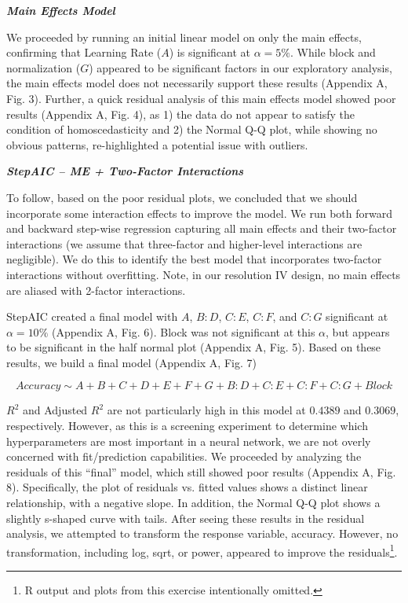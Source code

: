 \documentclass[12pt]{article}
\begin{document}
\vspace{.5pc}
\noindent \textbf{\textit{Main Effects Model}}
\vspace{.1pc}

We proceeded by running an initial linear model on only the main effects, confirming that Learning Rate ($A$) is significant at $\alpha = 5\%$. While block and normalization ($G$) appeared to be significant factors in our exploratory analysis, the main effects model does not necessarily support these results (Appendix A, Fig. 3). Further, a quick residual analysis of this main effects model showed poor results (Appendix A, Fig. 4), as 1) the data do not appear to satisfy the condition of homoscedasticity and 2) the Normal Q-Q plot, while showing no obvious patterns, re-highlighted a potential issue with outliers.

\vspace{.5pc}
\noindent \textbf{\textit{StepAIC – ME + Two-Factor Interactions}}
\vspace{.1pc}

To follow, based on the poor residual plots, we concluded that we should incorporate some interaction effects to improve the model. We run both forward and backward step-wise regression capturing all main effects and their two-factor interactions (we assume that three-factor and higher-level interactions are negligible). We do this to identify the best model that incorporates two-factor interactions without overfitting. Note, in our resolution IV design, no main effects are aliased with 2-factor interactions.

StepAIC created a final model with $A$, $B:D$, $C:E$, $C:F$, and $C:G$ significant at $\alpha = 10\%$ (Appendix A, Fig. 6). Block was not significant at this $\alpha$, but appears to be significant in the half normal plot (Appendix A, Fig. 5). Based on these results, we build a final model (Appendix A, Fig. 7)

$$Accuracy \sim A + B + C + D + E + F + G + B:D + C:E + C:F + C:G + Block$$

$R^2$ and Adjusted $R^2$ are not particularly high in this model at $0.4389$ and $0.3069$, respectively. However, as this is a screening experiment to determine which hyperparameters are most important in a neural network, we are not overly concerned with fit/prediction capabilities. We proceeded by analyzing the residuals of this “final” model, which still showed poor results (Appendix A, Fig. 8). Specifically, the plot of residuals vs. fitted values shows a distinct linear relationship, with a negative slope. In addition, the Normal Q-Q plot shows a slightly s-shaped curve with tails. After seeing these results in the residual analysis, we attempted to transform the response variable, accuracy. However, no transformation, including log, sqrt, or power, appeared to improve the residuals\footnote{R output and plots from this exercise intentionally omitted.}. 
\end{document}

